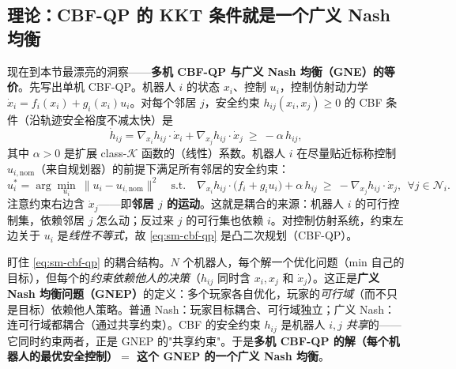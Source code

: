 \subsection{理论：CBF-QP 的 KKT 条件就是一个广义 Nash 均衡}
\label{sec:sm-cbf-gne}

现在到本节最漂亮的洞察——\textbf{多机 CBF-QP 与广义 Nash 均衡（GNE）的等价}。先写出单机 CBF-QP。机器人 $i$ 的状态 $x_i$、控制 $u_i$，控制仿射动力学 $\dot x_i=f_i(x_i)+g_i(x_i)u_i$。对每个邻居 $j$，安全约束 $h_{ij}(x_i,x_j)\ge0$ 的 CBF 条件（沿轨迹安全裕度不减太快）是
\begin{equation}
  \dot h_{ij}=\nabla_{x_i}h_{ij}\cdot\dot x_i+\nabla_{x_j}h_{ij}\cdot\dot x_j\ \ge\ -\alpha\,h_{ij},
  \label{eq:sm-cbf-cond}
\end{equation}
其中 $\alpha>0$ 是扩展 class-$\mathcal{K}$ 函数的（线性）系数\cite{wang2017safety}。机器人 $i$ 在尽量贴近标称控制 $u_{i,\text{nom}}$（来自规划器）的前提下满足所有邻居的安全约束：
\begin{equation}
  u_i^*=\arg\min_{u_i}\ \|u_i-u_{i,\text{nom}}\|^2\quad\text{s.t.}\quad
  \nabla_{x_i}h_{ij}\cdot\big(f_i+g_iu_i\big)+\alpha\,h_{ij}\ \ge\ -\nabla_{x_j}h_{ij}\cdot\dot x_j,\ \ \forall j\in\mathcal{N}_i.
  \label{eq:sm-cbf-qp}
\end{equation}
注意约束右边含 $\dot x_j$——即\textbf{邻居 $j$ 的运动}。这就是耦合的来源：机器人 $i$ 的可行控制集，依赖邻居 $j$ 怎么动；反过来 $j$ 的可行集也依赖 $i$。对控制仿射系统，约束左边关于 $u_i$ 是\emph{线性不等式}，故 \cref{eq:sm-cbf-qp} 是凸二次规划（CBF-QP）。

\begin{insight}[共享约束下的并行优化 $=$ 广义 Nash 均衡]
盯住 \cref{eq:sm-cbf-qp} 的耦合结构。$N$ 个机器人，每个解一个优化问题（min 自己的目标），但每个的\emph{约束依赖他人的决策}（$h_{ij}$ 同时含 $x_i,x_j$ 和 $\dot x_j$）。这正是\textbf{广义 Nash 均衡问题（GNEP）}的定义：多个玩家各自优化，玩家的\emph{可行域}（而不只是目标）依赖他人策略。普通 Nash：玩家目标耦合、可行域独立；广义 Nash：连可行域都耦合（通过共享约束）。CBF 的安全约束 $h_{ij}$ 是机器人 $i,j$ \emph{共享}的——它同时约束两者，正是 GNEP 的"共享约束"。于是\textbf{多机 CBF-QP 的解（每个机器人的最优安全控制）$=$ 这个 GNEP 的一个广义 Nash 均衡}。
\end{insight}

